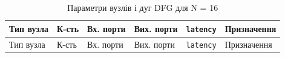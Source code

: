 \documentclass[
]{article}
\newcommand{\passthrough}[1]{#1}
\begin{document}
\begin{longtable}[]{@{}
  >{\raggedright\arraybackslash}p{}
  >{\raggedright\arraybackslash}p{}
  >{\raggedright\arraybackslash}p{}
  >{\raggedright\arraybackslash}p{}
  >{\raggedright\arraybackslash}p{}
  >{\raggedright\arraybackslash}p{}@{}}
\caption[Параметри вузлів і дуг DFG для N = 16]{Параметри вузлів і дуг
DFG для N = 16}\tabularnewline
\toprule\noalign{}
\begin{minipage}[b]{\linewidth}\raggedright
Тип вузла
\end{minipage} & \begin{minipage}[b]{\linewidth}\raggedright
К-сть
\end{minipage} & \begin{minipage}[b]{\linewidth}\raggedright
Вх. порти
\end{minipage} & \begin{minipage}[b]{\linewidth}\raggedright
Вих. порти
\end{minipage} & \begin{minipage}[b]{\linewidth}\raggedright
\passthrough{\lstinline!latency!}
\end{minipage} & \begin{minipage}[b]{\linewidth}\raggedright
Призначення
\end{minipage} \\
\midrule\noalign{}
\endfirsthead
\toprule\noalign{}
\begin{minipage}[b]{\linewidth}\raggedright
Тип вузла
\end{minipage} & \begin{minipage}[b]{\linewidth}\raggedright
К-сть
\end{minipage} & \begin{minipage}[b]{\linewidth}\raggedright
Вх. порти
\end{minipage} & \begin{minipage}[b]{\linewidth}\raggedright
Вих. порти
\end{minipage} & \begin{minipage}[b]{\linewidth}\raggedright
\passthrough{\lstinline!latency!}
\end{minipage} & \begin{minipage}[b]{\linewidth}\raggedright
Призначення
\end{minipage} \\

\end{longtable}
\end{document}
